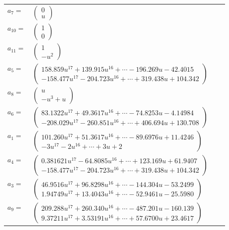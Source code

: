 \documentclass[1p]{elsarticle_modified}
\theoremstyle{definition}
\begin{document}
\begin{tabular}{m{7pt} m{180pt} m{7pt} m{180pt} }
\flushright $a_{7}=$&$\begin{pmatrix}0\\u\end{pmatrix}$ \\
\flushright $a_{10}=$&$\begin{pmatrix}1\\0\end{pmatrix}$ \\
\flushright $a_{11}=$&$\begin{pmatrix}1\\- u^2\end{pmatrix}$ \\
\flushright $a_{5}=$&$\begin{pmatrix}158.859 u^{17}+139.915 u^{16}+\cdots-196.269 u-42.4015\\-158.477 u^{17}-204.723 u^{16}+\cdots+319.438 u+104.342\end{pmatrix}$ \\
\flushright $a_{8}=$&$\begin{pmatrix}u\\- u^3+u\end{pmatrix}$ \\
\flushright $a_{6}=$&$\begin{pmatrix}83.1322 u^{17}+49.3617 u^{16}+\cdots-74.8253 u-4.14984\\-208.029 u^{17}-260.851 u^{16}+\cdots+406.694 u+130.708\end{pmatrix}$ \\
\flushright $a_{1}=$&$\begin{pmatrix}101.260 u^{17}+51.3617 u^{16}+\cdots-89.6976 u+11.4246\\-3 u^{17}-2 u^{16}+\cdots+3 u+2\end{pmatrix}$ \\
\flushright $a_{4}=$&$\begin{pmatrix}0.381621 u^{17}-64.8085 u^{16}+\cdots+123.169 u+61.9407\\-158.477 u^{17}-204.723 u^{16}+\cdots+319.438 u+104.342\end{pmatrix}$ \\
\flushright $a_{3}=$&$\begin{pmatrix}46.9516 u^{17}+96.8298 u^{16}+\cdots-144.304 u-53.2499\\1.94749 u^{17}+13.4043 u^{16}+\cdots-52.9461 u-25.5980\end{pmatrix}$ \\
\flushright $a_{9}=$&$\begin{pmatrix}209.288 u^{17}+260.340 u^{16}+\cdots-487.201 u-160.139\\9.37211 u^{17}+3.53191 u^{16}+\cdots+57.6700 u+23.4617\end{pmatrix}$ \\

\end{tabular}
\end{document}
